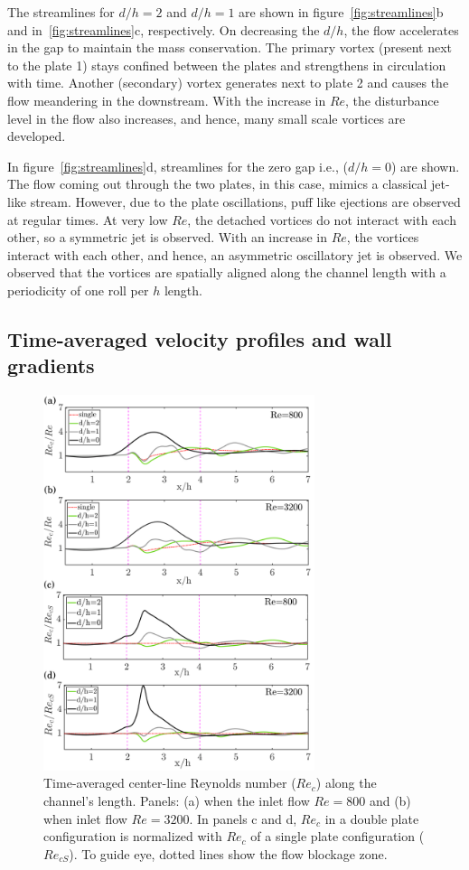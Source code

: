\documentclass[aps,pre,twocolumn,aps,longbibliography]{revtex4-1}
\begin{document}
	The streamlines for $d/h=2$ and $d/h=1$ are shown in figure~\ref{fig:streamlines}b and in~\ref{fig:streamlines}c, respectively. On decreasing the $d/h$, the flow accelerates in the gap to maintain the mass conservation. The primary vortex (present next to the plate 1) stays confined between the plates and strengthens in circulation with time. Another (secondary) vortex generates next to plate 2 and causes the flow meandering in the downstream. With the increase in $Re$, the disturbance level in the flow also increases, and hence, many small scale vortices are developed.
	
	In figure~\ref{fig:streamlines}d, streamlines for the zero gap i.e., ($d/h=0$) are shown. The flow coming out through the two plates, in this case, mimics a classical jet-like stream. However, due to the plate oscillations, puff like ejections are observed at regular times. At very low $Re$, the detached vortices do not interact with each other, so a symmetric jet is observed. With an increase in $Re$, the vortices interact with each other, and hence, an asymmetric oscillatory jet is observed. We observed that the vortices are spatially aligned along the channel length with a periodicity of one roll per $h$ length.
	
	
	\subsection{Time-averaged velocity profiles and wall gradients}
	
	
	\begin{figure}
		\begin{minipage}[c]{1\linewidth}
			\includegraphics[width=1\linewidth, height=11cm]{Fig11.pdf} 
		\end{minipage} 
		\caption{Time-averaged center-line Reynolds number ($Re_c$) along the channel's length. Panels: (a) when the inlet flow $Re=800$ and (b) when inlet flow $Re=3200$. In panels c and d, $Re_c$ in a double plate configuration is normalized with $Re_c$ of a single plate configuration ($Re_{cS}$). To guide eye, dotted lines show the flow blockage zone.}
		\label{fig:Vcentre_vs_x}
		\vspace{0cm}
	\end{figure}
	
\end{document}

